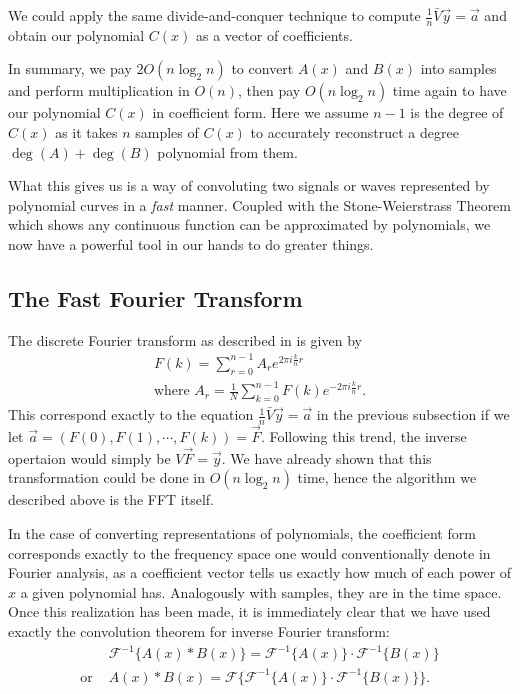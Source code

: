 \documentclass[12pt]{article}
\begin{document}
We could apply the same divide-and-conquer technique to compute $\frac{1}{n}\bar{V}\vec{y} = \vec{a}$ and obtain our polynomial $C(x)$ as a vector of coefficients.

In summary, we pay $2O(n\log_2{n})$ to convert $A(x)$ and $B(x)$ into samples and perform multiplication in $O(n)$, then pay $O(n\log_2{n})$ time again to have our polynomial $C(x)$ in coefficient form. Here we assume $n-1$ is the degree of $C(x)$ as it takes $n$ samples of $C(x)$ to accurately reconstruct a degree $\deg(A)+\deg(B)$ polynomial from them. 

What this gives us is a way of convoluting two signals or waves represented by polynomial curves in a \emph{fast} manner. Coupled with the Stone-Weierstrass Theorem which shows any continuous function can be approximated by polynomials, we now have a powerful tool in our hands to do greater things.

\subsection{The Fast Fourier Transform}


The discrete Fourier transform as described in \cite{text} is given by
\begin{eqnarray*}
F(k) = \displaystyle \sum_{r=0}^{n-1} A_r e^{2\pi i\frac{k}{n}r}\\
\text{where } A_r = \frac{1}{N} \displaystyle \sum_{k=0}^{n-1} F(k) e^{-2\pi i\frac{k}{n}r}.
\end{eqnarray*}
This correspond exactly to the equation $\frac{1}{n}\bar{V}\vec{y}=\vec{a}$ in the previous subsection if we let $\vec{a} = (F(0),F(1),\cdots,F(k)) = \vec{F}$. Following this trend, the inverse opertaion would simply be $V\vec{F} = \vec{y}$. We have already shown that this transformation could be done in $O(n\log_2n)$ time, hence the algorithm we described above is the FFT itself.

In the case of converting representations of polynomials, the coefficient form corresponds exactly to the frequency space one would conventionally denote in Fourier analysis, as a coefficient vector tells us exactly how much of each power of $x$ a given polynomial has. Analogously with samples, they are in the time space. Once this realization has been made, it is immediately clear that we have used exactly the convolution theorem for inverse Fourier transform: 
\begin{eqnarray*}
&\mathscr{F}^{-1}\{A(x)*B(x)\} =\mathscr{F}^{-1}\{A(x)\}\cdot\mathscr{F}^{-1}\{B(x)\}\\
\text{or } &A(x)*B(x) =\mathscr{F}\{\mathscr{F}^{-1}\{A(x)\}\cdot\mathscr{F}^{-1}\{B(x)\}\}.
\end{eqnarray*}
\end{document}
